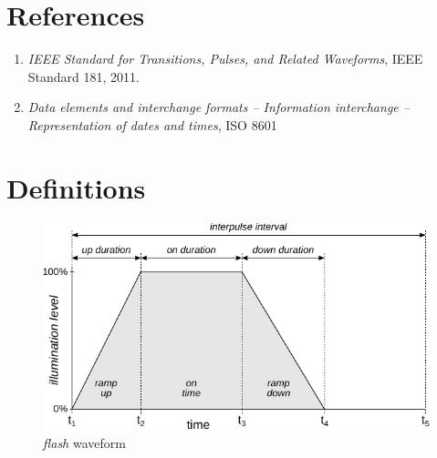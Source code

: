 \documentclass[letterpaper,11pt]{article}
\begin{document}
\section{References}

\begin{enumerate}
  \item 
\textit{IEEE Standard for Transitions, Pulses, and Related Waveforms},
  IEEE Standard 181, 2011.
  \item 
\textit{Data elements and interchange formats – Information
interchange – Representation of dates and times}, ISO 8601
\end{enumerate}


\section{Definitions}

\begin{figure}[h]
  \begin{center}
    \includegraphics{Flashes_FlashPulse}
  \end{center}
  \vspace{-18pt}
  \caption{\textit{flash} waveform}
  \label{fig:FlashPulse}
\end{figure}
\end{document}

